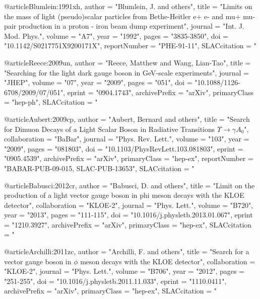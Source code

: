{{{{{{{{{{{{{{{{{@article{Blumlein:1991xh,
      author         = "Blumlein, J. and others",
      title          = "{Limits on the mass of light (pseudo)scalar particles
                        from Bethe-Heitler e+ e- and mu+ mu- pair production in a
                        proton - iron beam dump experiment}",
      journal        = "Int. J. Mod. Phys.",
      volume         = "A7",
      year           = "1992",
      pages          = "3835-3850",
      doi            = "10.1142/S0217751X9200171X",
      reportNumber   = "PHE-91-11",
      SLACcitation   = "%
}

@article{Reece:2009un,
      author         = "Reece, Matthew and Wang, Lian-Tao",
      title          = "{Searching for the light dark gauge boson in GeV-scale
                        experiments}",
      journal        = "JHEP",
      volume         = "07",
      year           = "2009",
      pages          = "051",
      doi            = "10.1088/1126-6708/2009/07/051",
      eprint         = "0904.1743",
      archivePrefix  = "arXiv",
      primaryClass   = "hep-ph",
      SLACcitation   = "%
}

@article{Aubert:2009cp,
      author         = "Aubert, Bernard and others",
      title          = "{Search for Dimuon Decays of a Light Scalar Boson in
                        Radiative Transitions $\Upsilon \rightarrow \gamma A_{0}$}",
      collaboration  = "BaBar",
      journal        = "Phys. Rev. Lett.",
      volume         = "103",
      year           = "2009",
      pages          = "081803",
      doi            = "10.1103/PhysRevLett.103.081803",
      eprint         = "0905.4539",
      archivePrefix  = "arXiv",
      primaryClass   = "hep-ex",
      reportNumber   = "BABAR-PUB-09-015, SLAC-PUB-13653",
      SLACcitation   = "%
}

@article{Babusci:2012cr,
      author         = "Babusci, D. and others",
      title          = "{Limit on the production of a light vector gauge boson in
                        phi meson decays with the KLOE detector}",
      collaboration  = "KLOE-2",
      journal        = "Phys. Lett.",
      volume         = "B720",
      year           = "2013",
      pages          = "111-115",
      doi            = "10.1016/j.physletb.2013.01.067",
      eprint         = "1210.3927",
      archivePrefix  = "arXiv",
      primaryClass   = "hep-ex",
      SLACcitation   = "%
}

@article{Archilli:2011zc,
      author         = "Archilli, F. and others",
      title          = "{Search for a vector gauge boson in $\phi$ meson decays
                        with the KLOE detector}",
      collaboration  = "KLOE-2",
      journal        = "Phys. Lett.",
      volume         = "B706",
      year           = "2012",
      pages          = "251-255",
      doi            = "10.1016/j.physletb.2011.11.033",
      eprint         = "1110.0411",
      archivePrefix  = "arXiv",
      primaryClass   = "hep-ex",
      SLACcitation   = "%
}

}}}}}}}}}}}}}}}}}
